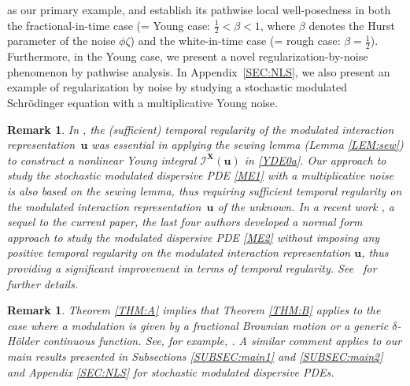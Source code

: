 \documentclass[letterpaper, 11pt,  reqno]{amsart}
\newtheorem{remark}[theorem]{Remark}
\newcommand{\1}{\hspace{0.5mm}\textup{I}\hspace{0.5mm}}
\newcommand{\I}{\mathcal{I}}
\newcommand{\noi}{\noindent}
\newcommand{\be}{\beta}
\newcommand{\dl}{\delta}
\newcommand{\uu}{\mathbf{u}}
\newcommand{\z}{\zeta}
\newcommand{\XX}{\mathbf{X}}
\numberwithin{equation}{section}
\numberwithin{theorem}{section}
\begin{document}
\noi
as our primary example, 
and establish its pathwise local well-posedness
in both the fractional-in-time case (= Young case: $\frac 12 < \be < 1$, 
where $\be$ denotes the Hurst parameter of 
 the noise $\phi \z$)
and the white-in-time case (= rough case: $\be = \frac 12$).
Furthermore, 
in  the Young case, 
we 
 present
a  novel regularization-by-noise phenomenon
by pathwise analysis.
In Appendix~\ref{SEC:NLS},
we also present an example of regularization by noise
by studying a stochastic modulated
Schr\"odinger equation
with a multiplicative Young noise.














\begin{remark}\label{REM:NF}\rm 
In \cite{CGLLO1}, 
 the (sufficient) temporal regularity of
the modulated interaction representation~$\uu$
was essential 
in applying the sewing lemma (Lemma \ref{LEM:sew})
to construct
a nonlinear Young integral
$\I^\XX(\uu)$ in \eqref{YDE0a}.
Our approach to study the stochastic modulated 
dispersive PDE \eqref{ME1} with a multiplicative noise
is also based on the sewing lemma, 
thus requiring  sufficient temporal regularity 
on the modulated interaction representation~$\uu$ of the unknown.
In a recent work
\cite{GLLO}, a sequel to the current paper, 
the last four authors 
developed a normal form approach 
to study the modulated dispersive PDE \eqref{ME2}
{\it without}
imposing any 
 positive temporal regularity
 on the modulated interaction representation $\uu$, 
 thus providing a significant improvement
 in terms of temporal regularity.
See~\cite{GLLO}
for further details.







\end{remark}




\begin{remark}\rm

	


Theorem \ref{THM:A} 
implies that Theorem \ref{THM:B}
applies 
to the case
where a modulation is given by a fractional Brownian motion
or a generic  $\dl$-H\"older continuous function.
See, for example, \cite[Corollary~1.5]{CGLLO1}.
A similar comment applies to our main results 
presented in Subsections \ref{SUBSEC:main1}
and  \ref{SUBSEC:main2}
and Appendix \ref{SEC:NLS}
for stochastic modulated dispersive PDEs.

\end{remark}
\end{document}
